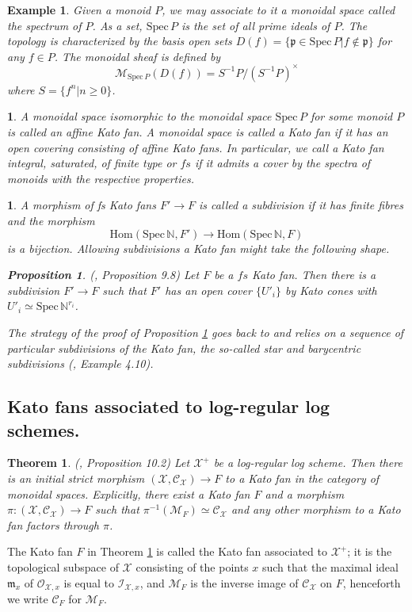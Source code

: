 \documentclass{amsart}%
\numberwithin{equation}{subsection}
\theoremstyle{plain2}
\newtheorem{thm}[equation]{Theorem}
\newtheorem{prop}[equation]{Proposition}
\theoremstyle{definition2}
\newtheorem{example}[equation]{Example}
\theoremstyle{stepstyle}
\theoremstyle{point}
\theoremstyle{subpoint}
\newtheorem{subpoint}[equation]{}%
\newcommand{\spa}[1]{\begin{subpoint}#1\end{subpoint}}           %
\newcommand{\N}{\ensuremath{\mathbb{N}}}
\newcommand{\cX}{\ensuremath{\mathscr{X}}}
\newcommand{\fp}{\ensuremath{\mathfrak{p}}}
\newcommand{\caM}{\ensuremath{\mathcal{M}}}
\newcommand{\caC}{\ensuremath{\mathcal{C}}}
\newcommand{\Spec}{\ensuremath{\mathrm{Spec}\,}}
\newcommand{\Hom}{\mathrm{Hom}}
\begin{document}
\begin{example}
Given a monoid $P$, we may associate to it a monoidal space called the spectrum of $P$. As a set, $\Spec P$ is the set of all prime ideals of $P$. The topology is characterized by the basis open sets $D(f)= \{ \fp \in \Spec P | f \notin \fp \}$ for any $f \in P$. The monoidal sheaf is defined by $$\caM_{\Spec P} (D(f))= S^{-1}P / (S^{-1}P)^{\times}$$ where $S=\{f^n | n \geqslant 0\}$.
\end{example}

\spa{A monoidal space isomorphic to the monoidal space $\Spec P$ for some monoid $P$ is called an affine Kato fan. A monoidal space is called a Kato fan if it has an open covering consisting of affine Kato fans. In particular, we call a Kato fan integral, saturated, of finite type or $fs$ if it admits a cover by the spectra of monoids with the respective properties.}

\spa{A morphism of fs Kato fans $F' \rightarrow F$ is called a \emph{subdivision} if it has finite fibres and the morphism $$\Hom(\Spec \N, F') \rightarrow \Hom (\Spec \N, F)$$ is a bijection. Allowing subdivisions a Kato fan might take the following shape.
\begin{prop} \label{kato subdivision}(\cite{Kato1994a}, Proposition 9.8)
Let $F$ be a $fs$ Kato fan. Then there is a subdivision $F' \rightarrow F$ such that $F'$ has an open cover $\{U'_i\}$ by Kato cones with $U'_i \simeq \Spec \N^{r_i}$. 
\end{prop}
The strategy of the proof of Proposition \ref{kato subdivision} goes back to \cite{KempfKnudsenMumfordEtAl1973} and relies on a sequence of particular subdivisions of the Kato fan, the so-called star and barycentric subdivisions (\cite{AbramovichChenMarcusEtAl2015}, Example 4.10).}

\subsection{Kato fans associated to log-regular log schemes.}
\begin{thm}\label{kato fan associated} (\cite{Kato1994a}, Proposition 10.2)
Let $\cX^+$ be a log-regular log scheme. Then there is an initial strict morphism $(\cX, \caC_{\cX}) \rightarrow F$ to a Kato fan in the category of monoidal spaces. Explicitly, there exist a Kato fan $F$ and a morphism $\pi: (\cX, \caC_{\cX}) \rightarrow F$ such that $\pi^{-1}(\caM_{F}) \simeq \caC_{\cX}$ and any other morphism to a Kato fan factors through $\pi$.
\end{thm}
The Kato fan $F$ in Theorem \ref{kato fan associated} is called the Kato fan associated to $\cX^+$; it is the topological subspace of
$\cX$ consisting of the points $x$ such that the maximal ideal $\mathfrak{m}_x$ of
$\mathcal{O}_{\cX,x}$ is equal to $\mathcal{I}_{\cX,x}$, and
$\mathcal{M}_F$ is the inverse image of $\mathcal{C}_{\cX}$ on
$F$, henceforth we write $\caC_F$ for $\caM_F$.
\end{document}

